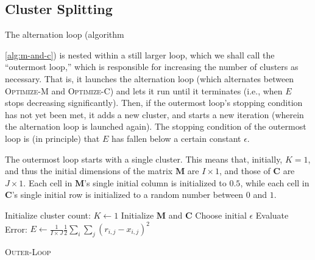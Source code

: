 \subsection{Cluster Splitting}
\label{sec:cl-split}
The alternation loop (algorithm~{\ref{alg:m-and-c}) is nested within a still 
larger loop, which we shall call the ``outermost loop,'' which is responsible 
for increasing the number of clusters as necessary. That is, it launches the 
alternation loop (which alternates between \textsc{Optimize-M} and 
\textsc{Optimize-C}) and lets it run until it terminates (i.e., when $E$ stops 
decreasing significantly). Then, if the outermost loop's stopping condition 
has not yet been met, it adds a new cluster, and starts a new iteration (wherein 
the alternation loop is launched again). The stopping condition of the 
outermost loop is (in principle) that $E$ has fallen below a certain 
constant $\epsilon$.

 The outermost loop starts with a single cluster. This means that, initially, 
 $K = 1$, and thus the initial dimensions of the matrix $\textbf{M}$ are 
 $I \times 1$, and those of $\textbf{C}$ are $J \times 1$. Each cell in $\textbf{M}$'s 
 single initial column is initialized to $0.5$, while each cell in $\textbf{C}$'s 
 single initial row is initialized to a random number between $0$ and $1$.  

\begin{algorithm}[t]
Initialize cluster count: $K \gets 1$\;
Initialize $\textbf{M}$ and $\textbf{C}$\;
Choose initial $\epsilon$\;
Evaluate Error: $E \gets\frac{1}{I\times J} \frac{1}{2} \sum_i \sum_j (r_{i,j} - x_{i,j})^2$\;\label{line:init-E}
\caption{\textsc{Outer-Loop}}
\label{alg:outer-loop}
\end{algorithm}

}
